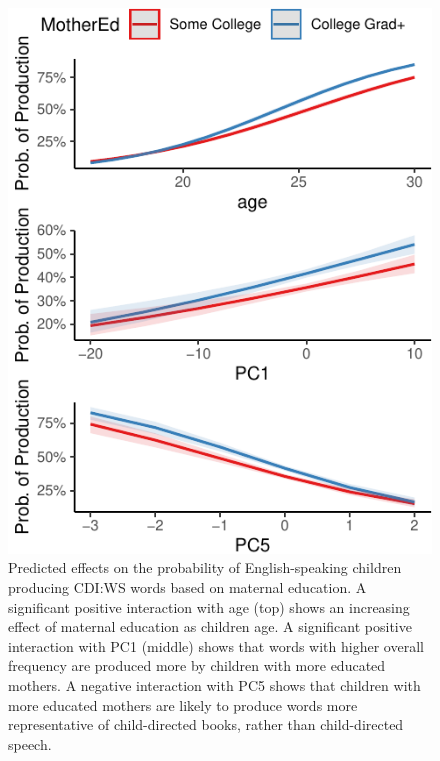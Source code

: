 \documentclass[10pt, letterpaper]{article}
\newenvironment{CodeChunk}{}{}
\begin{document}
\begin{CodeChunk}
\begin{figure}[t]

{\centering \includegraphics{figs/unnamed-chunk-12-1} 

}

\caption[Predicted effects on the probability of English-speaking children producing CDI:WS words based on maternal education]{Predicted effects on the probability of English-speaking children producing CDI:WS words based on maternal education. A significant positive interaction with age (top) shows an increasing effect of maternal education as children age. A significant positive interaction with PC1 (middle) shows that words with higher overall frequency are produced more by children with more educated mothers. A negative interaction with PC5 shows that children with more educated mothers are likely to produce words more representative of child-directed books, rather than child-directed speech.}\label{fig:unnamed-chunk-12}
\end{figure}
\end{CodeChunk}
\end{document}
